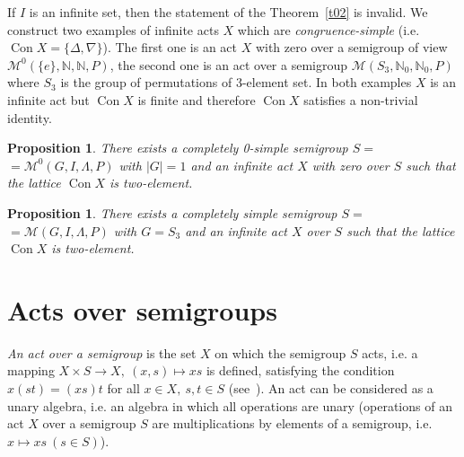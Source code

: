 \documentclass{birkau}
\numberwithin{equation}{section}
\theoremstyle{plain}
\newtheorem{proposition}[theorem]{Proposition}
\theoremstyle{definition}
\DeclareMathOperator{\Con}{Con}
\begin{document}
	If $I$ is an infinite set, then the statement of the Theorem~\ref{t02} is invalid. We construct two examples of infinite acts $X$ which are \textit{congruence-simple} (i.e. $\Con X = \{ \Delta, \nabla \}$). The first one is an act $X$ with zero over a semigroup of view $\mathcal{M}^0(\{e\},\mathbb{N},\mathbb{N},P)$, the second one is an act over a semigroup $\mathcal{M}(S_3,\mathbb{N}_0,\mathbb{N}_0,P)$ where $S_3$ is the group of permutations of 3-element set. In both examples $X$ is an infinite act but $\Con X$ is finite and therefore $\Con X$ satisfies a non-trivial identity.
	
	\begin{proposition} \label{pr01a}
	    There exists a completely 0-simple semigroup $ S = $ \newline $ = \mathcal{M}^0(G,I,\Lambda,P) $ with $|G| = 1$ and an infinite act $X$ with zero over $S$ such that the lattice $\Con X$ is two-element.
	\end{proposition}
	
	\begin{proposition} \label{pr2.1}
	    There exists a completely simple semigroup $ S = $ \newline $ = \mathcal{M}(G,I,\Lambda,P) $ with $G = S_3$ and an infinite act $X$ over $S$ such that the lattice $\Con X$ is two-element.
	\end{proposition}

\section{Acts over semigroups}	

	\textit{An act over a semigroup} is the set $X$ on which the semigroup $S$ acts, i.e. a mapping $ X \times S \rightarrow X,\ (x,s) \mapsto xs $ is defined, satisfying the condition $ x(st)=(xs)t $ for all $x\in X,\ s,t\in S$ (see~\cite{kilp}). An act can be considered as a unary algebra, i.e. an algebra in which all operations are unary (operations of an act $X$ over a semigroup $S$ are multiplications by elements of a semigroup, i.e. $ x \mapsto xs \ (s\in S) $).
	
\end{document}
